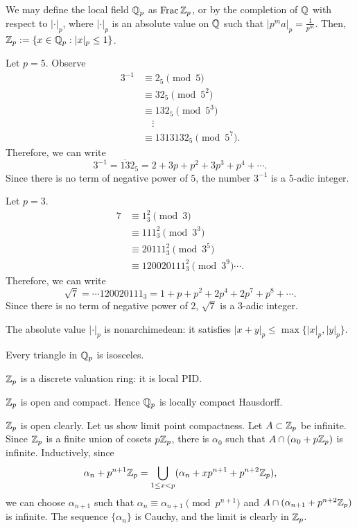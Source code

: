 \documentclass{../../large}
\begin{document}
We may define the local field $\mathbb{Q}_p$ as $\operatorname{Frac}\mathbb{Z}_p$, or by the completion of $\mathbb{Q}$ with respect to $|\cdot|_p$, where $|\cdot|_p$ is an absolute value on $\mathbb{Q}$ such that $|p^ma|_p=\frac1{p^m}$.
Then,
$\mathbb{Z}_p:=\{x\in\mathbb{Q}_p:|x|_p\le1\}$.

\begin{ex}
Let $p=5$.
Observe
\begin{align*}
3^{-1}&\equiv2_5\pmod5\\
&\equiv32_5\pmod{5^2}\\
&\equiv132_5\pmod{5^3}\\
&\quad\vdots\\
&\equiv1313132_5\pmod{5^7}.
\end{align*}
Therefore, we can write
\[3^{-1}=\overline{13}2_5=2+3p+p^2+3p^3+p^4+\cdots.\]
Since there is no term of negative power of $5$, the number $3^{-1}$ is a $5$-adic integer.
\end{ex}
\begin{ex}
Let $p=3$.
\begin{align*}
7&\equiv1_3^2\pmod3\\
&\equiv111_3^2\pmod{3^3}\\
&\equiv20111_3^2\pmod{3^5}\\
&\equiv120020111_3^2\pmod{3^9}\cdots.
\end{align*}
Therefore, we can write
\[\sqrt7=\cdots120020111_3=1+p+p^2+2p^4+2p^7+p^8+\cdots.\]
Since there is no term of negative power of $2$, $\sqrt7$ is a $3$-adic integer.
\end{ex}

\begin{prb}
\begin{parts}
\item
The absolute value $|\cdot|_p$ is nonarchimedean: it satisfies $|x+y|_p\le\max\{|x|_p,|y|_p\}$.
\item
Every triangle in $\mathbb{Q}_p$ is isosceles.
\item
$\mathbb{Z}_p$ is a discrete valuation ring: it is local PID.
\item
$\mathbb{Z}_p$ is open and compact.
Hence $\mathbb{Q}_p$ is locally compact Hausdorff.
\end{parts}
\end{prb}
\begin{pf}
$\mathbb{Z}_p$ is open clearly.
Let us show limit point compactness.
Let $A\subset\mathbb{Z}_p$ be infinite.
Since $\mathbb{Z}_p$ is a finite union of cosets $p\mathbb{Z}_p$, there is $\alpha_0$ such that $A\cap(\alpha_0+p\mathbb{Z}_p)$ is infinite.
Inductively, since
\[\alpha_n+p^{n+1}\mathbb{Z}_p=\bigcup_{1\le x<p}(\alpha_n+xp^{n+1}+p^{n+2}\mathbb{Z}_p),\]
we can choose $\alpha_{n+1}$ such that $\alpha_n\equiv\alpha_{n+1}\pmod{p^{n+1}}$ and $A\cap(\alpha_{n+1}+p^{n+2}\mathbb{Z}_p)$ is infinite.
The sequence $\{\alpha_n\}$ is Cauchy, and the limit is clearly in $\mathbb{Z}_p$.
\end{pf}
\end{document}
